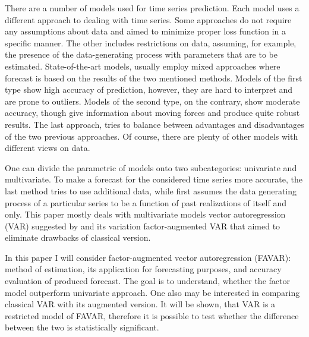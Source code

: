 \documentclass[a4paper, 14pt]{article}
\begin{document}
There are a number of models used for time series prediction. Each model uses a different approach to dealing with time series. Some approaches do not require any assumptions about data and aimed to minimize proper loss function in a specific manner. The other includes restrictions on data, assuming, for example, the presence of the data-generating process with parameters that are to be estimated. State-of-the-art models, usually employ mixed approaches where forecast is based on the results of the two mentioned methods. Models of the first type show high accuracy of prediction, however, they are hard to interpret and are prone to outliers. Models of the second type, on the contrary, show moderate accuracy, though give information about moving forces and produce quite robust results. The last approach, tries to balance between advantages and disadvantages of the two previous approaches. Of course, there are plenty of other models with different views on data. 

One can divide the parametric of models onto two subcategories: univariate and multivariate. To make a forecast for the considered time series more accurate, the last method tries to use additional data, while first assumes the data generating process of a particular series to be a function of past realizations of itself and only. This paper mostly deals with multivariate models vector autoregression (VAR) suggested by \cite{sims1980martingale} and its variation factor-augmented VAR that aimed to eliminate drawbacks of classical version.  

In this paper I will consider factor-augmented vector autoregression (FAVAR): method of estimation, its application for forecasting purposes, and accuracy evaluation of produced forecast. The goal is to understand, whether the factor model outperform univariate approach. One also may be interested in comparing classical VAR with its augmented version. It will be shown, that VAR is a restricted model of FAVAR, therefore it is possible to test whether the difference between the two is statistically significant. 
 
\end{document}
